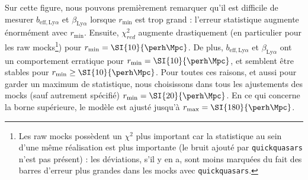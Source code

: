 Sur cette figure, nous pouvons premièrement remarquer qu'il est difficile de mesurer $b_{\mathrm{eff},\mathrm{Ly}\alpha}$ et $\beta_{\mathrm{Ly}\alpha}$ lorsque $r_{\mathrm{min}}$ est trop grand : l'erreur statistique augmente énormément avec $r_{\mathrm{min}}$.
Ensuite, $\chi_{red}^2$ augmente drastiquement (en particulier pour les raw mocks\footnote{Les raw mocks possèdent un $\chi^2$ plus important car la statistique au sein d'une même réalisation est plus importante (le bruit ajouté par \texttt{quickquasars} n'est pas présent) : les déviations, s'il y en a, sont moins marquées du fait des barres d'erreur plus grandes dans les mocks avec \texttt{quickquasars}.}) pour $r_{\mathrm{min}} = \SI{10}{\perh\Mpc}$. De plus, $b_{\mathrm{eff},\mathrm{Ly}\alpha}$ et $\beta_{\mathrm{Ly}\alpha}$ ont un comportement erratique pour $r_{\mathrm{min}} = \SI{10}{\perh\Mpc}$, et semblent être stables pour $r_{\mathrm{min}} \geq \SI{10}{\perh\Mpc}$.
Pour toutes ces raisons, et aussi pour garder un maximum de statistique, nous choisissons dans tous les ajustements des mocks (sauf autrement spécifié) $r_{\mathrm{min}} = \SI{20}{\perh\Mpc}$.
En ce qui concerne la borne supérieure, le modèle est ajusté jusqu'à $r_{\mathrm{max}} = \SI{180}{\perh\Mpc}$.


